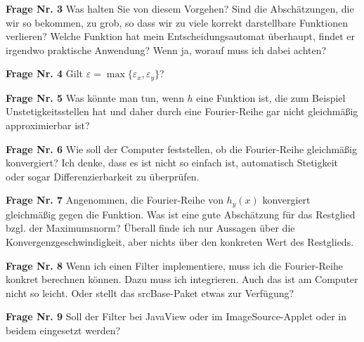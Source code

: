 \documentclass[a4paper]{article}
\begin{document}
\textbf{Frage Nr. 3} Was halten Sie von diesem Vorgehen? Sind die Abschätzungen, die wir so bekommen, zu grob, so dass wir zu viele korrekt darstellbare Funktionen verlieren? Welche Funktion hat mein Entscheidungsautomat überhaupt, findet er irgendwo praktische Anwendung? Wenn ja, worauf muss ich dabei achten?

\textbf{Frage Nr. 4} Gilt $\varepsilon=\max \{ \varepsilon_x, \varepsilon_y \}$?

\textbf{Frage Nr. 5} Was könnte man tun, wenn $h$ eine Funktion ist, die zum Beispiel Unstetigkeitsstellen hat und daher durch eine Fourier-Reihe gar nicht gleichmäßig approximierbar ist?

\textbf{Frage Nr. 6} Wie soll der Computer feststellen, ob die Fourier-Reihe gleichmäßig konvergiert? Ich denke, dass es ist nicht so einfach ist, automatisch Stetigkeit oder sogar Differenzierbarkeit zu überprüfen. 

\textbf{Frage Nr. 7} Angenommen, die Fourier-Reihe von $h_y(x)$ konvergiert gleichmäßig gegen die Funktion. Was ist eine gute Abschätzung für das Restglied bzgl. der Maximumsnorm? Überall finde ich nur Aussagen über die Konvergenzgeschwindigkeit, aber nichts über den konkreten Wert des Restglieds.

\textbf{Frage Nr. 8} Wenn ich einen Filter implementiere, muss ich die Fourier-Reihe konkret berechnen können. Dazu muss ich integrieren. Auch das ist am Computer nicht so leicht. Oder stellt das srcBase-Paket etwas zur Verfügung?

\textbf{Frage Nr. 9} Soll der Filter bei JavaView oder im ImageSource-Applet oder in beidem eingesetzt werden?



\end{document}
